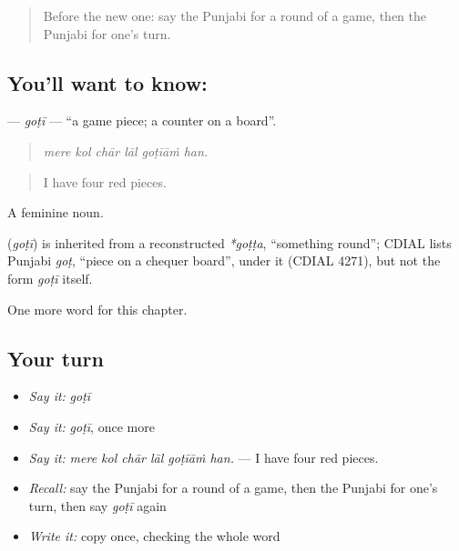 \label{lesson:PA-C352-goti}



\begin{quote}
Before the new one: say the Punjabi for a round of a game, then the Punjabi for one's turn.
\end{quote}

\subsection*{You'll want to know: }
\textbf{} — \emph{goṭī} — \textquotedblleft{}a game piece; a counter on a board\textquotedblright{}.

\begin{quote}
     
\end{quote}

\begin{quote}
\emph{mere kol chār lāl goṭīāṁ han.}
\end{quote}

\begin{quote}
I have four red pieces.
\end{quote}

A feminine noun.

\begin{cousinweb}
\textbf{} (\emph{goṭī}) is inherited from a reconstructed \emph{*goṭṭa}, \textquotedblleft{}something round\textquotedblright{}; CDIAL lists Punjabi \emph{goṭ}, \textquotedblleft{}piece on a chequer board\textquotedblright{}, under it (CDIAL 4271), but not the form \emph{goṭī} itself.
\end{cousinweb}

\begin{grammarlens}[title={What you've built}]
One more word for this chapter.
\end{grammarlens}

\subsection*{Your turn}
\begin{itemize}
\raggedright
  \item \emph{Say it:} \emph{goṭī}
  \item \emph{Say it:} \emph{goṭī}, once more
  \item \emph{Say it:} \emph{mere kol chār lāl goṭīāṁ han.} — I have four red pieces.
  \item \emph{Recall:} say the Punjabi for a round of a game, then the Punjabi for one's turn, then say \emph{goṭī} again
  \item \emph{Write it:} copy \textbf{} once, checking the whole word
\end{itemize}

